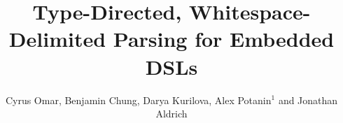 \documentclass[english]{sig-alternate}
\begin{document}
\title{Type-Directed, Whitespace-Delimited Parsing for Embedded DSLs}
%
\author{
\alignauthor
Cyrus Omar, Benjamin Chung, Darya Kurilova, Alex Potanin$^{1}$ and Jonathan Aldrich\\
       \\
}

\maketitle
\end{document}

